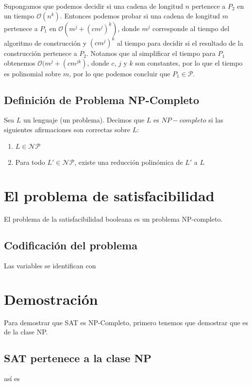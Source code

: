 \documentclass[a4paper]{article}
\begin{document}
Supongamos que podemos decidir si una cadena de longitud $n$ pertenece a $P_2$
en un tiempo $\mathcal{O}(n^{k})$. Entonces podemos probar si una cadena de
longitud $m$ pertenece a $P_1$ en $\mathcal{O}(m^j + (cm^j)^k)$,
donde $m^j$ corresponde al tiempo del algoritmo de construcción y $(cm^j)^k$ al
tiempo para decidir si el resultado de la construcción pertenece a $P_2$.
Notamos que al simplificar el tiempo para $P_1$ obtenemos
$\mathcal{O}(m^j + (cm^{jk})$, donde $c$, $j$ y $k$ son constantes, por lo que
el tiempo es polinomial sobre $m$, por lo que podemos concluir que $P_1 \in \mathcal{P}$.

\subsection{Definición de Problema NP-Completo}
Sea $L$ un lenguaje (un problema). Decimos que $L$ es $NP-completo$ si las
siguientes afirmaciones son correctas sobre $L$:
\begin{enumerate}
  \item $L \in \mathcal{NP}$
  \item Para todo $L' \in \mathcal{NP}$, existe una reducción polinómica de $L'$ a $L$
\end{enumerate}


\section{El problema de satisfacibilidad}
El problema de la satisfacibilidad booleana es un problema NP-completo\cite{cook1971complexity}.



\subsection{Codificación del problema}

Las variables se identifican con

\section{Demostración}
Para demostrar que SAT es NP-Completo, primero tenemos que demostrar que es de la clase NP.

\subsection{SAT pertenece a la clase NP}
así es
\end{document}
